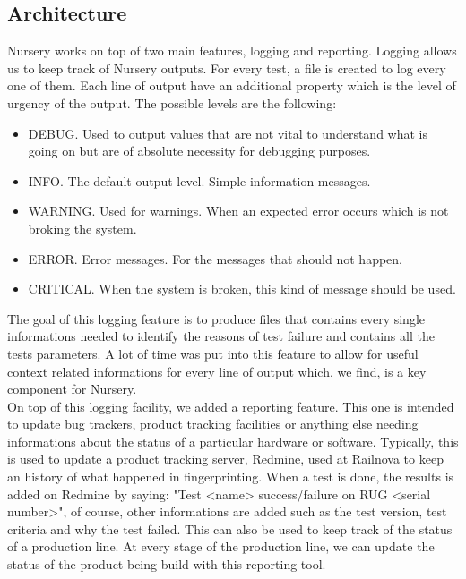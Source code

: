 \documentclass[12pt]{article}
\theoremstyle{definition}
\theoremstyle{definition}
\begin{document}
\subsection{Architecture}

Nursery works on top of two main features, logging and reporting. Logging allows us to keep track of Nursery outputs. For every test, a file is created to log every one of them. Each line of output have an additional property which is the level of urgency of the output. The possible levels are the following:

\begin{itemize}
\item DEBUG. Used to output values that are not vital to understand what is going on but are of absolute necessity for debugging purposes.
\item INFO. The default output level. Simple information messages.
\item WARNING. Used for warnings. When an expected error occurs which is not broking the system.
\item ERROR. Error messages. For the messages that should not happen.
\item CRITICAL. When the system is broken, this kind of message should be used.
\end{itemize}

The goal of this logging feature is to produce files that contains every single informations needed to identify the reasons of test failure and contains all the tests parameters. A lot of time was put into this feature to allow for useful context related informations for every line of output which, we find, is a key component for Nursery.\\

On top of this logging facility, we added a reporting feature. This one is intended to update bug trackers, product tracking facilities or anything else needing informations about the status of a particular hardware or software. Typically, this is used to update a product tracking server, Redmine, used at Railnova to keep an history of what happened in fingerprinting. When a test is done, the results is added on Redmine by saying: "Test <name> success/failure on RUG <serial number>", of course, other informations are added such as the test version, test criteria and why the test failed. This can also be used to keep track of the status of a production line. At every stage of the production line, we can update the status of the product being build with this reporting tool.\\
\end{document}
